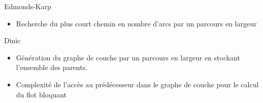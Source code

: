 \begin{frame}{Edmonds-Karp}
	 \begin{itemize}
  	\item Recherche du plus court chemin en nombre d'arcs par un parcours en largeur
  \end{itemize}
\end{frame}

\begin{frame}{Dinic}
	 \begin{itemize}
	 	\item Génération du graphe de couche par un parcours en largeur en stockant l'ensemble des parents.
  	\item Complexité de l'accès au prédécesseur dans le graphe de couche pour le calcul du flot bloquant
  \end{itemize}
\end{frame}